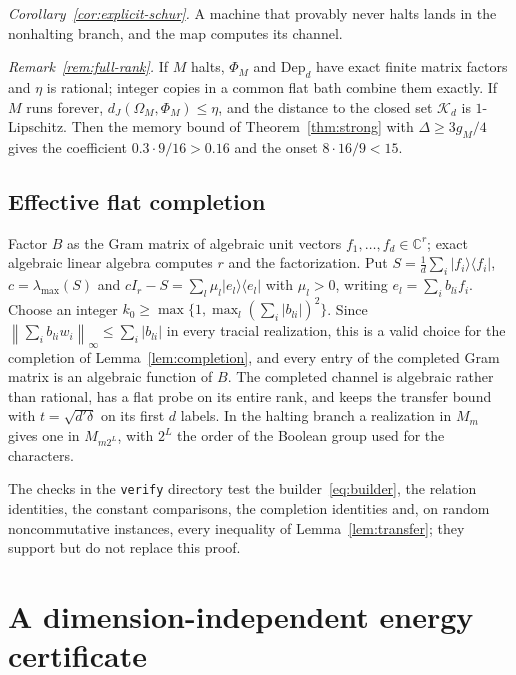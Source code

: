 \documentclass[11pt]{article}
\theoremstyle{definition}
\theoremstyle{remark}
\newcommand{\K}{\mathcal K}
\newcommand{\C}{\mathbb C}
\newcommand{\norm}[1]{\left\lVert#1\right\rVert}
\newcommand{\ket}[1]{\lvert#1\rangle}
\newcommand{\bra}[1]{\langle#1\rvert}
\begin{document}
\emph{Corollary~\ref{cor:explicit-schur}.} A machine that provably never halts lands in the nonhalting branch, and the map computes its channel.

\emph{Remark~\ref{rem:full-rank}.} If $M$ halts, $\Phi_M$ and $\mathrm{Dep}_d$ have exact finite matrix factors and $\eta$ is rational; integer copies in a common flat bath combine them exactly. If $M$ runs forever, $d_J(\Omega_M,\Phi_M)\le\eta$, and the distance to the closed set $\K_d$ is $1$-Lipschitz. Then the memory bound of Theorem~\ref{thm:strong} with $\Delta\ge3g_M/4$ gives the coefficient $0.3\cdot9/16>0.16$ and the onset $8\cdot16/9<15$.

\subsection{Effective flat completion}

Factor $B$ as the Gram matrix of algebraic unit vectors $f_1,\dots,f_d\in\C^r$; exact algebraic linear algebra computes $r$ and the factorization. Put $S=\frac1d\sum_i\ket{f_i}\bra{f_i}$, $c=\lambda_{\max}(S)$ and $cI_r-S=\sum_l\mu_l\ket{e_l}\bra{e_l}$ with $\mu_l>0$, writing $e_l=\sum_ib_{li}f_i$. Choose an integer $k_0\ge\max\{1,\max_l(\sum_i|b_{li}|)^2\}$. Since $\norm{\sum_ib_{li}w_i}_\infty\le\sum_i|b_{li}|$ in every tracial realization, this is a valid choice for the completion of Lemma~\ref{lem:completion}, and every entry of the completed Gram matrix is an algebraic function of $B$. The completed channel is algebraic rather than rational, has a flat probe on its entire rank, and keeps the transfer bound with $t=\sqrt{d'\delta}$ on its first $d$ labels. In the halting branch a realization in $M_m$ gives one in $M_{m2^L}$, with $2^L$ the order of the Boolean group used for the characters.

The checks in the \texttt{verify} directory test the builder~\eqref{eq:builder}, the relation identities, the constant comparisons, the completion identities and, on random noncommutative instances, every inequality of Lemma~\ref{lem:transfer}; they support but do not replace this proof.


\section{A dimension-independent energy certificate}\label{app:energy}
\end{document}
